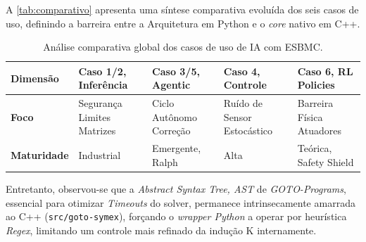 A \autoref{tab:comparativo} apresenta uma síntese comparativa evoluída dos seis casos de uso, definindo a barreira entre a Arquitetura em Python e o \textit{core} nativo em C++.

\begin{table}[htb]
\caption{Análise comparativa global dos casos de uso de IA com ESBMC.}
\label{tab:comparativo}
\begin{center}
\begin{tabular}{p{2.5cm}|p{2.4cm}|p{2.4cm}|p{2.4cm}|p{2.4cm}}
\hline
\textbf{Dimensão} & \textbf{Caso 1/2, Inferência} & \textbf{Caso 3/5, Agentic} & \textbf{Caso 4, Controle} & \textbf{Caso 6, RL Policies} \\
\hline
\textbf{Foco} & Segurança Limites Matrizes & Ciclo Autônomo Correção & Ruído de Sensor Estocástico & Barreira Física Atuadores \\
\hline
\textbf{Maturidade} & Industrial & Emergente, Ralph & Alta & Teórica, Safety Shield \\
\hline
\end{tabular}
\end{center}
\end{table}

Entretanto, observou-se que a \textit{Abstract Syntax Tree, AST} de \textit{GOTO-Programs}, essencial para otimizar \textit{Timeouts} do solver, permanece intrinsecamente amarrada ao C++ (\texttt{src/goto-symex}), forçando o \textit{wrapper Python} a operar por heurística \textit{Regex}, limitando um controle mais refinado da indução K internamente.
